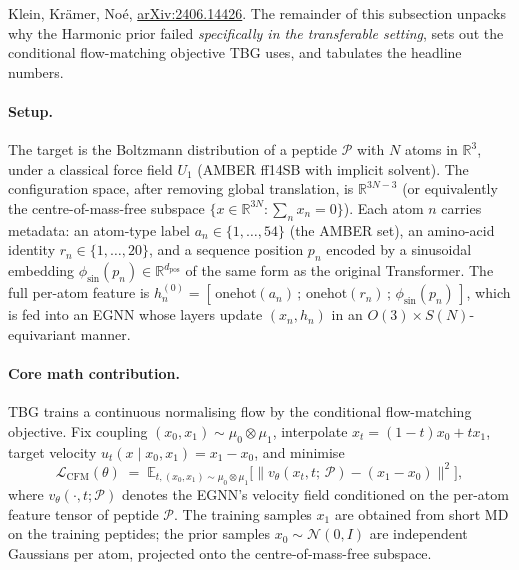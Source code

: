 \documentclass[11pt,letterpaper]{article}
\newcommand{\E}{\mathbb{E}}
\newcommand{\Real}{\mathbb{R}}
\theoremstyle{plain}
\begin{document}
Klein, Krämer, Noé, \href{https://arxiv.org/abs/2406.14426}{arXiv:2406.14426}.
The remainder of this subsection unpacks why the Harmonic prior failed
\emph{specifically in the transferable setting}, sets out the conditional
flow-matching objective TBG uses, and tabulates the headline numbers.

\paragraph{Setup.} The target is the Boltzmann distribution of a peptide
$\mathcal P$ with $N$ atoms in $\Real^3$, under a classical force field
$U_1$ (AMBER ff14SB with implicit solvent). The configuration space, after
removing global translation, is $\Real^{3N-3}$ (or equivalently the
centre-of-mass-free subspace $\{x\in\Real^{3N}:\sum_n x_n = 0\}$). Each atom
$n$ carries metadata: an atom-type label $a_n\in\{1,\dots,54\}$ (the AMBER
set), an amino-acid identity $r_n\in\{1,\dots,20\}$, and a sequence position
$p_n$ encoded by a sinusoidal embedding
$\phi_{\sin}(p_n)\in\Real^{d_{\mathrm{pos}}}$ of the same form as the
original Transformer. The full per-atom feature is
$h_n^{(0)} = [\,\mathrm{onehot}(a_n)\,;\,\mathrm{onehot}(r_n)\,;\,\phi_{\sin}(p_n)\,]$,
which is fed into an EGNN whose layers update $(x_n, h_n)$ in an
$O(3)\times S(N)$-equivariant manner.

\paragraph{Core math contribution.} TBG trains a continuous normalising flow
by the conditional flow-matching objective. Fix coupling
$(x_0,x_1)\sim\mu_0\otimes\mu_1$, interpolate $x_t = (1-t)x_0 + t x_1$, target
velocity $u_t(x\mid x_0,x_1) = x_1 - x_0$, and minimise
\begin{equation}
  \mathcal L_{\mathrm{CFM}}(\theta) \;=\; \E_{t,(x_0,x_1)\sim\mu_0\otimes\mu_1}\!
  \Big[\big\|v_\theta(x_t,t;\,\mathcal P) - (x_1-x_0)\big\|^2\Big],
  \label{eq:tbg-cfm}
\end{equation}
where $v_\theta(\cdot,t;\mathcal P)$ denotes the EGNN's velocity field
conditioned on the per-atom feature tensor of peptide $\mathcal P$. The
training samples $x_1$ are obtained from short MD on the training peptides;
the prior samples $x_0\sim\mathcal N(0,I)$ are independent Gaussians per
atom, projected onto the centre-of-mass-free subspace.
\end{document}
